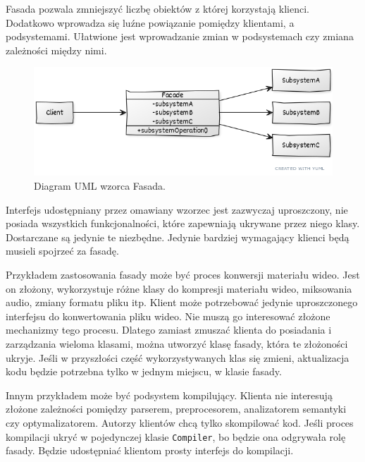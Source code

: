 Fasada pozwala zmniejszyć liczbę obiektów z której korzystają klienci. Dodatkowo wprowadza się luźne powiązanie pomiędzy klientami, a podsystemami. Ułatwione jest wprowadzanie zmian w podsystemach czy zmiana zależności między nimi. 

\begin{figure}[hbt!]
	\centering
	\includegraphics[width=0.8\linewidth]{images/FacadeUml}
	\caption{Diagram UML wzorca Fasada.}
	\label{lab3/fig/FacadeUml}
\end{figure}
%

Interfejs udostępniany przez omawiany wzorzec jest zazwyczaj uproszczony, nie posiada wszystkich funkcjonalności, które zapewniają ukrywane przez niego klasy. Dostarczane są jedynie te niezbędne. Jedynie bardziej wymagający klienci będą musieli spojrzeć za fasadę.

Przykładem zastosowania fasady może być proces konwersji materiału wideo. Jest on złożony, wykorzystuje różne klasy do kompresji materiału wideo, miksowania audio, zmiany formatu pliku itp. Klient może potrzebować jedynie uproszczonego interfejsu do konwertowania pliku wideo. Nie muszą go interesować złożone mechanizmy tego procesu. Dlatego zamiast zmuszać klienta do posiadania i zarządzania wieloma klasami, można utworzyć klasę fasady, która te złożoności ukryje. Jeśli w przyszłości część wykorzystywanych klas się zmieni, aktualizacja kodu będzie potrzebna tylko w jednym miejscu, w klasie fasady.

Innym przykładem może być podsystem kompilujący. Klienta nie interesują złożone zależności pomiędzy parserem, preprocesorem, analizatorem semantyki czy optymalizatorem. Autorzy klientów chcą tylko skompilować kod. Jeśli proces kompilacji ukryć w pojedynczej klasie \texttt{Compiler}, bo będzie ona odgrywała rolę fasady. Będzie udostępniać klientom prosty interfejs do kompilacji.
